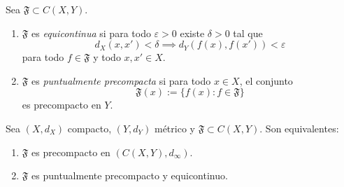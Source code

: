 \begin{definicion}
Sea $\mathfrak{F}\subset C(X,Y)$.
\begin{enumerate}
    \item $\mathfrak{F}$ es \emph{equicontinua} si para todo $\varepsilon>0$ existe $\delta>0$ tal que
    \[
    d_X(x,x')<\delta \implies d_Y(f(x),f(x'))<\varepsilon
    \]
    para todo $f\in\mathfrak{F}$ y todo $x,x'\in X$.
    \item $\mathfrak{F}$ es \emph{puntualmente precompacta} si para todo $x\in X$, el conjunto
    \[
    \mathfrak{F}(x):=\{f(x):f\in\mathfrak{F}\}
    \]
    es precompacto en $Y$.
\end{enumerate}
\end{definicion}

\begin{teorema}
Sea $(X,d_X)$ compacto, $(Y,d_Y)$ métrico y $\mathfrak{F}\subset C(X,Y)$.
Son equivalentes:
\begin{enumerate}
    \item $\mathfrak{F}$ es precompacto en $(C(X,Y),d_\infty)$.
    \item $\mathfrak{F}$ es puntualmente precompacto y equicontinuo.
\end{enumerate}
\end{teorema}

